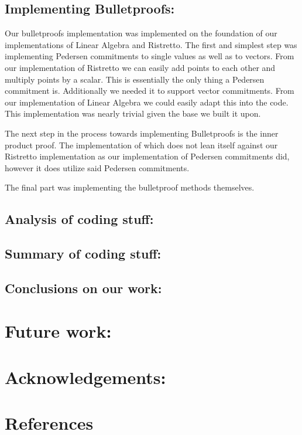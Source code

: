 \documentclass{article}
\begin{document}
\subsection{Implementing Bulletproofs:}

Our bulletproofs implementation was implemented on the foundation of our
implementations of Linear Algebra and Ristretto. The first and simplest
step was implementing Pedersen commitments to single values as well as to
vectors. From our implementation of Ristretto we can easily add points to
each other and multiply points by a scalar. This is essentially the only
thing a Pedersen commitment is. Additionally we needed it to support
vector commitments. From our implementation of Linear Algebra we could
easily adapt this into the code. This implementation was nearly trivial
given the base we built it upon.

The next step in the process towards implementing Bulletproofs is the
inner product proof. The implementation of which does not lean itself
against our Ristretto implementation as our implementation of Pedersen
commitments did, however it does utilize said Pedersen commitments. 


The final part was implementing the bulletproof methods themselves. 

\subsection{Analysis of coding stuff:}

\subsection{Summary of coding stuff:}

\subsection{Conclusions on our work:}

\section{Future work:}

\section{Acknowledgements:}


\section{References}
\printbibliography
\end{document}
